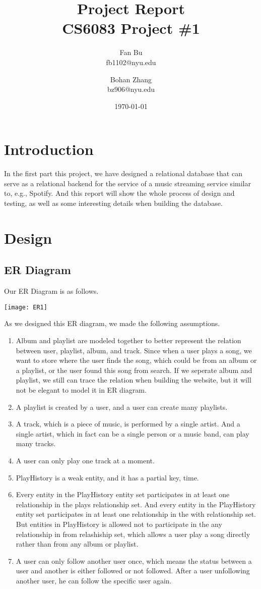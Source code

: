 \documentclass[letter, 12pt]{report}
\title{
	{Project Report}\\
	{\large CS6083 Project \#1}}
\author{Fan Bu \\ fb1102@nyu.edu \and Bohan Zhang \\ bz906@nyu.edu}
\date{\today}
\begin{document}
	\maketitle
	
	\tableofcontents
	
	\chapter{Introduction}
	In the first part this project, we have designed a relational database that can serve as a relational
	backend for the service of a music streaming service similar to, e.g., Spotify. And this report will show the whole process of design and testing, as well as some interesting details when building the database.
	
	\chapter{Design}
	\section{ER Diagram}
	Our ER Diagram is as follows.
	\begin{center}
	\texttt{[image: ER1]}
	\end{center}
	As we designed this ER diagram, we made the following assumptions.
	\begin{enumerate}
		\item 
		Album and playlist are modeled together to better represent the relation between user, playlist, album, and track. Since when a user plays a song, we want to store where the user finds the song, which could be from an album or a playlist, or the user found this song from search. If we seperate album and playlist, we still can trace the relation when building the website, but it will not be elegant to model it in ER diagram.
		\item 
		A playlist is created by a user, and a user can create many playlists.
		\item 
		A track, which is a piece of music, is performed by a single artist. And a single artist, which in fact can be a single person or a music band, can play many tracks.
		\item 
		A user can only play one track at a moment.
		\item 
		PlayHistory is a weak entity, and it has a partial key, time.
		\item 
		Every entity in the PlayHistory entity set participates in at least one relationship in the plays relationship set. And every entity in the PlayHistory entity set participates in at least one relationship in the with relationship set. But entities in PlayHistory is allowed not to participate in the any relationship in from relashiship set, which allows a user play a song directly rather than from any album or playlist.
		\item 
		A user can only follow another user once, which means the status between a user and another is either followed or not followed. After a user unfollowing another user, he can follow the specific user again.
	\end{enumerate}
\end{document}
